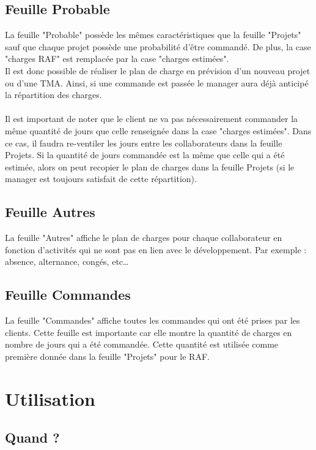 \documentclass[french]{report}
\begin{document}
\subsection{Feuille Probable}

La feuille "Probable" possède les mêmes caractéristiques que la feuille
"Projets" sauf que chaque  projet possède une probabilité d’être commandé. De
plus, la case "charges RAF" est remplacée par la case "charges estimées".\\ Il
est donc possible de réaliser le plan de charge en  prévision d’un nouveau
projet ou d’une TMA.  Ainsi, si une commande est passée le manager aura déjà
anticipé la répartition des charges.\\\\ Il est important de noter que le client
ne va pas nécessairement commander la même quantité de jours que celle
renseignée dans la case "charges estimées". Dans ce cas, il faudra re-ventiler
les jours entre les collaborateurs dans la feuille Projets. Si la quantité de
jours commandée est la même que celle qui a été estimée, alors on peut recopier
le plan de charges dans la feuille Projets (si le manager est toujours
satisfait de cette répartition).

\subsection{Feuille Autres}

La feuille "Autres" affiche le plan de charges pour chaque collaborateur en
fonction d’activités qui ne sont pas en lien avec le développement.
Par exemple : absence, alternance, congés, etc…

\subsection{Feuille Commandes}

La feuille "Commandes" affiche toutes les commandes qui ont été prises par les
clients. Cette feuille est importante car elle montre la quantité de charges en
nombre de jours qui a été commandée. Cette quantité est utilisée comme première
donnée dans la feuille "Projets" pour le RAF.

  \section{Utilisation}

\subsection{Quand ?}
\end{document}
